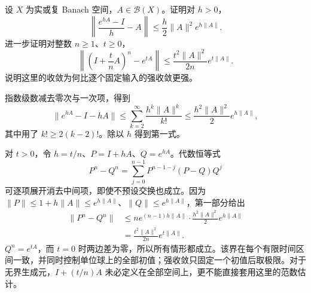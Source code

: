\begin{exercise}\label{b2:ex:app-D-2}
设 \(X\) 为实或复 Banach 空间，\(A\in\mathcal B(X)\)。证明对 \(h>0\)，
\[
 \left\|\frac{e^{hA}-I}{h}-A\right\|
 \leq\frac h2\|A\|^2e^{h\|A\|}.
\]
进一步证明对整数 \(n\geq1\)、\(t\geq0\)，
\[
 \left\|\left(I+\frac tnA\right)^n-e^{tA}\right\|
 \leq\frac{t^2\|A\|^2}{2n}e^{t\|A\|}.
\]
说明这里的收敛为何比逐个固定输入的强收敛更强。
\end{exercise}
\begin{solution}
指数级数减去零次与一次项，得到
\[
 \|e^{hA}-I-hA\|
 \leq\sum_{k=2}^\infty\frac{h^k\|A\|^k}{k!}
 \leq\frac{h^2\|A\|^2}{2}e^{h\|A\|},
\]
其中用了 \(k!\geq2(k-2)!\)。除以 \(h\) 得到第一式。

对 \(t>0\)，令 \(h=t/n\)、\(P=I+hA\)、\(Q=e^{hA}\)。代数恒等式
\[
 P^n-Q^n=\sum_{j=0}^{n-1}P^{n-1-j}(P-Q)Q^j
\]
可逐项展开消去中间项，即使不预设交换也成立。因为
\(\|P\|\leq1+h\|A\|\leq e^{h\|A\|}\)、\(\|Q\|\leq e^{h\|A\|}\)，第一部分给出
\[
 \begin{aligned}
 \|P^n-Q^n\|
 &\leq n e^{(n-1)h\|A\|}\cdot
           \frac{h^2\|A\|^2}{2}e^{h\|A\|}\\
 &=\frac{t^2\|A\|^2}{2n}e^{t\|A\|}.
 \end{aligned}
\]
\(Q^n=e^{tA}\)，而 \(t=0\) 时两边差为零，所以所有情形都成立。该界在每个有限时间区间一致，并同时控制单位球上的全部初值；强收敛只固定一个初值后取极限。对于无界生成元，\(I+(t/n)A\) 未必定义在全部空间上，更不能直接套用这里的范数估计。
\end{solution}

